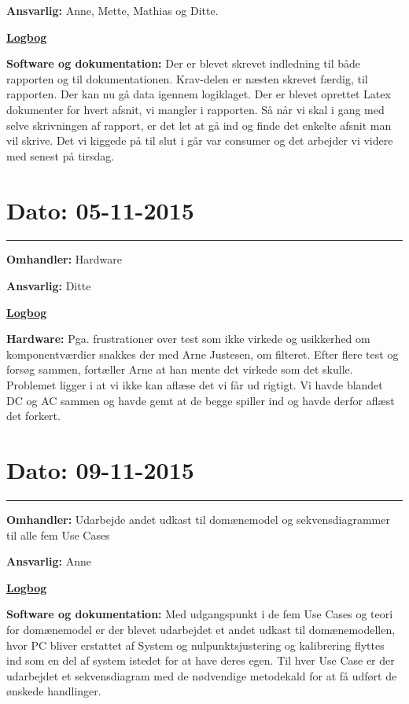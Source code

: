 \textbf{Ansvarlig:} Anne, Mette, Mathias og Ditte. 

\underline{\textbf{Logbog}}

\textbf{Software og dokumentation: }Der er blevet skrevet indledning til både rapporten og til dokumentationen. Krav-delen er næsten skrevet færdig, til rapporten. 
Der kan nu gå data igennem logiklaget. 
Der er blevet oprettet Latex dokumenter for hvert afsnit, vi mangler i rapporten. Så når vi skal i gang med selve skrivningen af rapport, er det let at gå ind og finde det enkelte afsnit man vil skrive. 
Det vi kiggede på til slut i går var consumer og det arbejder vi videre med senest på tirsdag. 
\\

\section{Dato: 05-11-2015}
\hrule
\textbf{Omhandler:} Hardware

\textbf{Ansvarlig:} Ditte

\underline{\textbf{Logbog}}

\textbf{Hardware: } Pga. frustrationer over test som ikke virkede og usikkerhed om komponentværdier snakkes der med Arne Justesen, om filteret. Efter flere test og forsøg sammen, fortæller Arne at han mente det virkede som det skulle. Problemet ligger i at vi ikke kan aflæse det vi får ud rigtigt. Vi havde blandet DC og AC sammen og havde gemt at de begge spiller ind og havde derfor aflæst det forkert.  
\\

\section{Dato: 09-11-2015}
\hrule
\textbf{Omhandler:} Udarbejde andet udkast til domænemodel og sekvensdiagrammer til alle fem Use Cases

\textbf{Ansvarlig:} Anne

\underline{\textbf{Logbog}}

\textbf{Software og dokumentation: }Med udgangspunkt i de fem Use Cases og teori for domænemodel er der blevet udarbejdet et andet udkast til domænemodellen, hvor PC bliver erstattet af System og nulpunktsjustering og kalibrering flyttes ind som en del af system istedet for at have deres egen.
Til hver Use Case er der udarbejdet et sekvensdiagram med de nødvendige metodekald for at få udført de ønskede handlinger.
\\

